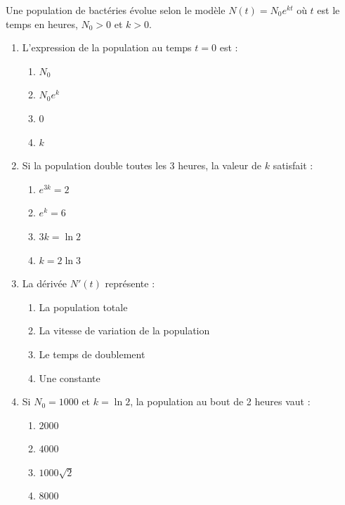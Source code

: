 \documentclass[11pt]{article}
\begin{document}
\begin{exercice}
Une population de bactéries évolue selon le modèle $N(t) = N_0 e^{kt}$ où $t$ est le temps en heures, $N_0>0$ et $k>0$.
\begin{enumerate}
    \item L'expression de la population au temps $t=0$ est :
    \begin{enumerate}
        \item $N_0$ \quad \item $N_0 e^k$ \quad \item $0$ \quad \item $k$
    \end{enumerate}
    \item Si la population double toutes les 3 heures, la valeur de $k$ satisfait :
    \begin{enumerate}
        \item $e^{3k}=2$ \quad \item $e^{k}=6$ \quad \item $3k=\ln 2$ \quad \item $k=2\ln 3$
    \end{enumerate}
    \item La dérivée $N'(t)$ représente :
    \begin{enumerate}
        \item La population totale \quad \item La vitesse de variation de la population \quad \item Le temps de doublement \quad \item Une constante
    \end{enumerate}
    \item Si $N_0=1000$ et $k=\ln 2$, la population au bout de 2 heures vaut :
    \begin{enumerate}
        \item $2000$ \quad \item $4000$ \quad \item $1000\sqrt{2}$ \quad \item $8000$
    \end{enumerate}
\end{enumerate}
\end{exercice}
\end{document}

